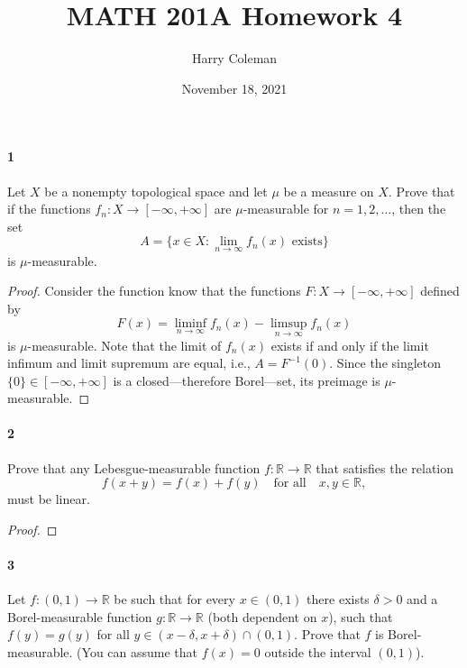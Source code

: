 \documentclass[12pt]{article}
\renewcommand{\maketitle}{\thispagestyle{title}}
\newlength{\myparskip}
\newenvironment{fullbox}{\begin{lrbox}{\savefullbox}\begin{minipage}{\dimexpr\textwidth-2\fboxsep\relax}\setlength{\parskip}{\myparskip}}{\end{minipage}\end{lrbox}\framebox[\textwidth]{\usebox{\savefullbox}}}
\newenvironment{pbox}[1][]{\begin{fullbox}\ifx#1\empty\else\paragraph{#1}\fi}{\end{fullbox}}
\newcommand{\isp}[1]{\quad\text{#1}\quad}
\newcommand{\R}{\mathbb{R}}
\newcommand{\<}{\langle}
\renewcommand{\>}{\rangle}
\begin{document}
\title{MATH 201A Homework 4}
\author{Harry Coleman}
\date{November 18, 2021}
\maketitle

\begin{pbox}[1]
    Let $X$ be a nonempty topological space and let $\mu$ be a measure on $X$. Prove that if the functions $f_n : X \to [-\infty, +\infty]$ are $\mu$-measurable for $n = 1, 2, \dots$, then the set
    \[
        A = \{x \in X : \lim_{n \to \infty} f_n(x) \text{ exists}\}
    \]
    is $\mu$-measurable.
\end{pbox}


\begin{proof}
    Consider the function know that the functions $F: X \to [-\infty, +\infty]$ defined by
    \[
        F(x) = \liminf_{n \to \infty} f_n(x) - \limsup_{n \to \infty} f_n(x)
    \]
    is $\mu$-measurable. Note that the limit of $f_n(x)$ exists if and only if the limit infimum and limit supremum are equal, i.e., $A = F^{-1}(0)$. Since the singleton $\{0\} \in [-\infty, +\infty]$ is a closed---therefore Borel---set, its preimage is $\mu$-measurable. 
\end{proof}


\newpage
\begin{pbox}[2]
    Prove that any Lebesgue-measurable function $f : \R \to \R$ that satisfies the relation
    \[
        f(x + y) = f(x) + f(y) \isp{for all} x, y \in \R,
    \]
    must be linear.
\end{pbox}

\begin{proof}
    
\end{proof}


\newpage
\begin{pbox}[3]
    Let $f : (0, 1) \to \R$ be such that for every $x \in (0, 1)$ there exists $\delta > 0$ and a Borel-measurable function $g : \R \to \R$ (both dependent on $x$), such that $f(y) = g(y)$ for all $y \in (x - \delta, x + \delta) \cap (0, 1)$. Prove that $f$ is Borel-measurable. (You can assume that $f(x) = 0$ outside the interval $(0, 1)$).
\end{pbox}
\end{document}
